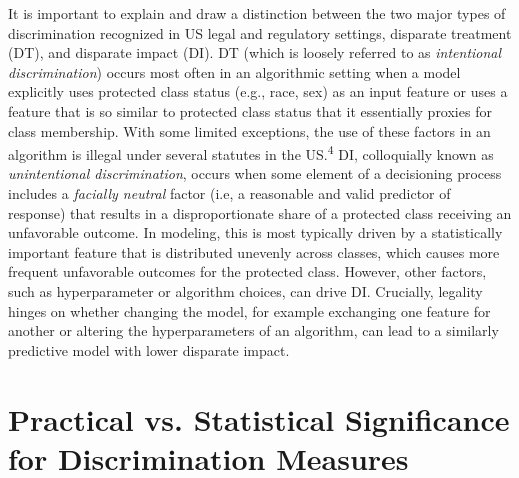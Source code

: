 \documentclass[information,article,submit,moreauthors,pdftex]{definitions/mdpi}
\begin{document}
It is important to explain and draw a distinction between the two major types of discrimination recognized in US legal and regulatory settings, disparate treatment (DT), and disparate impact (DI). DT (which is loosely referred to as \textit{intentional discrimination}) occurs most often in an algorithmic setting when a model explicitly uses protected class status (e.g., race, sex) as an input feature or uses a feature that is so similar to protected class status that it essentially proxies for class membership.  With some limited exceptions, the use of these factors in an algorithm is illegal under several statutes in the US.\textsuperscript{4} DI, colloquially known as \textit{unintentional discrimination}, occurs when some element of a decisioning process includes a \textit{facially neutral} factor (i.e, a reasonable and valid predictor of response) that results in a disproportionate share of a protected class receiving an unfavorable outcome.  In modeling, this is most typically driven by a statistically important feature that is distributed unevenly across classes, which causes more frequent unfavorable outcomes for the protected class.  However, other factors, such as hyperparameter or algorithm choices, can drive DI.  Crucially, legality hinges on whether changing the model, for example exchanging one feature for another or altering the hyperparameters of an algorithm, can lead to a similarly predictive model with lower disparate impact.

\section{Practical vs. Statistical Significance for Discrimination Measures}\label{a_sec:prac_v_stat}
\end{document}
